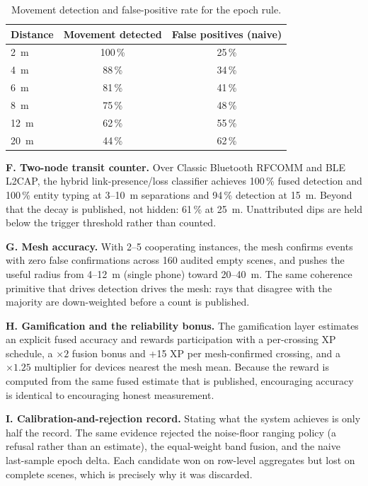 \documentclass[journal,10pt]{IEEEtran}
\begin{document}
\begin{table}[t]
  \centering
  \caption{Movement detection and false-positive rate for the epoch rule.}
  \label{tab:epoch}
  \footnotesize
  \begin{tabular}{@{}lcc@{}}
    \toprule
    Distance & Movement detected & False positives (naive) \\
    \midrule
    2~m & 100\,\% & 25\,\% \\
    4~m & 88\,\% & 34\,\% \\
    6~m & 81\,\% & 41\,\% \\
    8~m & 75\,\% & 48\,\% \\
    12~m & 62\,\% & 55\,\% \\
    20~m & 44\,\% & 62\,\% \\
    \bottomrule
  \end{tabular}
\end{table}

\textbf{F. Two-node transit counter.} Over Classic Bluetooth RFCOMM and BLE
L2CAP, the hybrid link-presence/loss classifier achieves 100\,\% fused
detection and 100\,\% entity typing at 3--10~m separations and 94\,\% detection
at 15~m. Beyond that the decay is published, not hidden: 61\,\% at 25~m.
Unattributed dips are held below the trigger threshold rather than counted.

\textbf{G. Mesh accuracy.} With 2--5 cooperating instances, the mesh confirms
events with zero false confirmations across 160 audited empty scenes, and
pushes the useful radius from 4--12~m (single phone) toward 20--40~m. The same
coherence primitive that drives detection drives the mesh: rays that disagree
with the majority are down-weighted before a count is published.

\textbf{H. Gamification and the reliability bonus.} The gamification layer
estimates an explicit fused accuracy and rewards participation with a
per-crossing XP schedule, a $\times 2$ fusion bonus and +15 XP per
mesh-confirmed crossing, and a $\times 1.25$ multiplier for devices nearest the
mesh mean. Because the reward is computed from the same fused estimate that is
published, encouraging accuracy is identical to encouraging honest measurement.

\textbf{I. Calibration-and-rejection record.} Stating what the system achieves
is only half the record. The same evidence rejected the noise-floor ranging
policy (a refusal rather than an estimate), the equal-weight band fusion, and
the naive last-sample epoch delta. Each candidate won on row-level aggregates
but lost on complete scenes, which is precisely why it was discarded.
\end{document}
